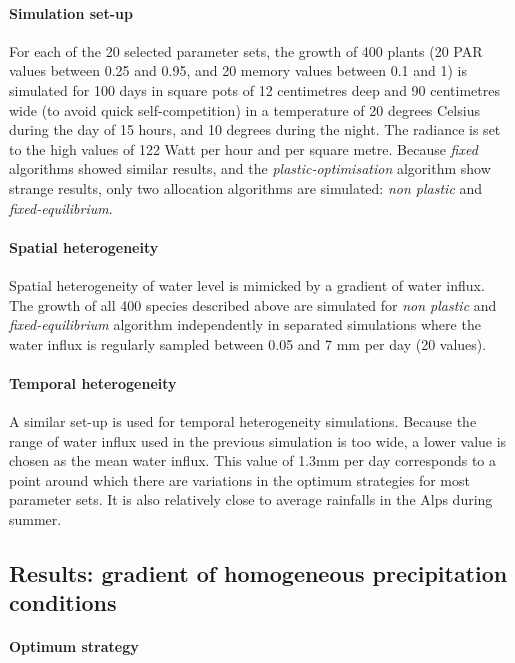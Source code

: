 \paragraph{Simulation set-up}
For each of the 20 selected parameter sets, the growth of 400 plants (20 PAR values between 0.25 and 0.95, and 20 memory values between 0.1 and 1) is simulated for 100 days in square pots of 12 centimetres deep and 90 centimetres wide (to avoid quick self-competition) in a temperature of 20 degrees Celsius during the day of 15 hours, and 10 degrees during the night. The radiance is set to the high values of 122 Watt per hour and per square metre. Because \textit{fixed} algorithms showed similar results, and the \textit{plastic-optimisation} algorithm show strange results, only two allocation algorithms are simulated: \textit{non plastic} and \textit{fixed-equilibrium}.

\paragraph{Spatial heterogeneity}
Spatial heterogeneity of water level is mimicked by a gradient of water influx. The growth of all 400 species described above are simulated for \textit{non plastic} and \textit{fixed-equilibrium} algorithm independently in separated simulations where the water influx is regularly sampled between 0.05 and 7 mm per day (20 values).

\paragraph{Temporal heterogeneity}
A similar set-up is used for temporal heterogeneity simulations. Because the range of water influx used in the previous simulation is too wide, a lower value is chosen as the mean water influx. This value of 1.3mm per day corresponds to a point around which there are variations in the optimum strategies for most parameter sets. It is also relatively close to average rainfalls in the Alps during summer. 

\subsection{Results: gradient of homogeneous precipitation conditions}

\paragraph{Optimum strategy}

